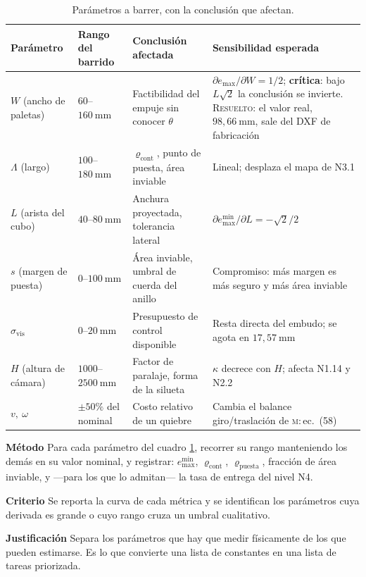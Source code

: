 \documentclass[11pt,a4paper]{article}
\newenvironment{prueba}[2]{%
  \par\medskip\noindent
  \begin{tcolorbox}[enhanced,breakable,colback=white,colframe=black!45,
    boxrule=0.5pt,arc=1pt,left=6pt,right=6pt,top=4pt,bottom=4pt,
    title={\bfseries #1\quad\normalfont #2},
    colbacktitle=black!8,coltitle=black,fonttitle=\bfseries\small]
  \small
}{\end{tcolorbox}\par\medskip}
\newcommand{\campo}[1]{\par\smallskip\noindent\textbf{#1}\quad\ignorespaces}
\begin{document}
\begin{table}[htbp]
\centering
\small
\caption{Parámetros a barrer, con la conclusión que afectan.}
\begin{tabular}{lp{2.4cm}p{4.2cm}p{4.6cm}}
\toprule
Parámetro & Rango del barrido & Conclusión afectada & Sensibilidad esperada \\
\midrule
$W$ (ancho de paletas) & $60$--$160\ \mathrm{mm}$ &
Factibilidad del empuje sin conocer $\theta$ &
$\partial e_{\max}/\partial W = 1/2$; \textbf{crítica}: bajo
$L\sqrt2$ la conclusión se invierte. \textsc{Resuelto}: el valor real,
$98{,}66\ \mathrm{mm}$, sale del DXF de fabricación \\
\addlinespace
$\Lambda$ (largo) & $100$--$180\ \mathrm{mm}$ &
$\varrho_{\mathrm{cont}}$, punto de puesta, área inviable &
Lineal; desplaza el mapa de N3.1 \\
\addlinespace
$L$ (arista del cubo) & $40$--$80\ \mathrm{mm}$ &
Anchura proyectada, tolerancia lateral &
$\partial e_{\max}^{\min}/\partial L = -\sqrt2/2$ \\
\addlinespace
$s$ (margen de puesta) & $0$--$100\ \mathrm{mm}$ &
Área inviable, umbral de cuerda del anillo &
Compromiso: más margen es más seguro y más área inviable \\
\addlinespace
$\sigma_{\mathrm{vis}}$ & $0$--$20\ \mathrm{mm}$ &
Presupuesto de control disponible &
Resta directa del embudo; se agota en $17{,}57\ \mathrm{mm}$ \\
\addlinespace
$H$ (altura de cámara) & $1000$--$2500\ \mathrm{mm}$ &
Factor de paralaje, forma de la silueta &
$\kappa$ decrece con $H$; afecta N1.14 y N2.2 \\
\addlinespace
$v,\ \omega$ & $\pm50\%$ del nominal &
Costo relativo de un quiebre &
Cambia el balance giro/traslación de \textsc{m}:\,ec.~(58) \\
\bottomrule
\end{tabular}
\label{tab:sensibilidad}
\end{table}

\begin{prueba}{S.1}{Barrido de sensibilidad}
\campo{Método} Para cada parámetro del cuadro \ref{tab:sensibilidad}, recorrer su rango
manteniendo los demás en su valor nominal, y registrar: $e_{\max}^{\min}$,
$\varrho_{\mathrm{cont}}$, $\varrho_{\mathrm{puesta}}$, fracción de área inviable, y
---para los que lo admitan--- la tasa de entrega del nivel N4.
\campo{Criterio} Se reporta la curva de cada métrica y se identifican los parámetros
cuya derivada es grande o cuyo rango cruza un umbral cualitativo.
\campo{Justificación} Separa los parámetros que hay que medir físicamente de los que
pueden estimarse. Es lo que convierte una lista de constantes en una lista de tareas
priorizada.
\end{prueba}
\end{document}
